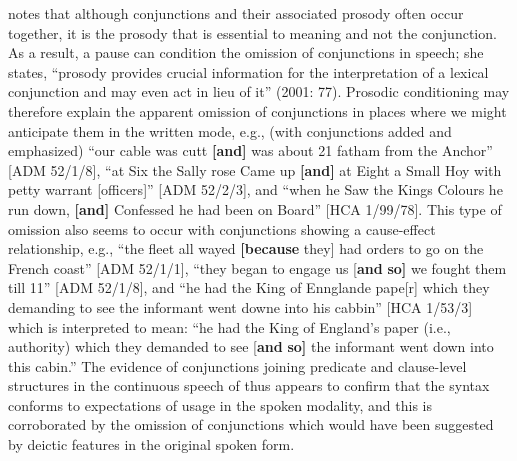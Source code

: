 \citeauthor{Wennerstron2001} notes that although conjunctions and their associated prosody often occur together, it is the prosody that is essential to meaning and not the conjunction. As a result, a pause can condition the omission of conjunctions in speech; she states, “prosody provides crucial information for the interpretation of a lexical conjunction and may even act in lieu of it” (2001: 77). Prosodic conditioning may therefore explain the apparent omission of conjunctions in places where we might anticipate them in the written mode, e.g., (with conjunctions added and emphasized) “our cable was cutt \textbf{[and]} was about 21 fatham from the Anchor” [ADM 52/1/8], “at Six the Sally rose Came up \textbf{[and]} at Eight a Small Hoy with petty warrant [officers]” [ADM 52/2/3], and  “when he Saw the Kings Colours he run down, \textbf{[and]} Confessed he had been on Board” [HCA 1/99/78]. This type of omission also seems to occur with conjunctions showing a cause-effect relationship, e.g., “the fleet all wayed \textbf{[because} they] had orders to go on the French coast” [ADM 52/1/1], “they began to engage us [\textbf{and} \textbf{so]} we fought them till 11” [ADM 52/1/8], and “he had the King of Ennglande pape[r] which they demanding to see the informant went downe into his cabbin” [HCA 1/53/3] which is interpreted to mean: “he had the King of England’s paper (i.e., authority) which they demanded to see [\textbf{and} \textbf{so]} the informant went down into this cabin.” The evidence of conjunctions joining predicate and clause-level structures in the continuous speech of  thus appears to confirm that the syntax conforms to expectations of usage in the spoken modality, and this is corroborated by the omission of conjunctions which would have been suggested by deictic features in the original spoken form. 

